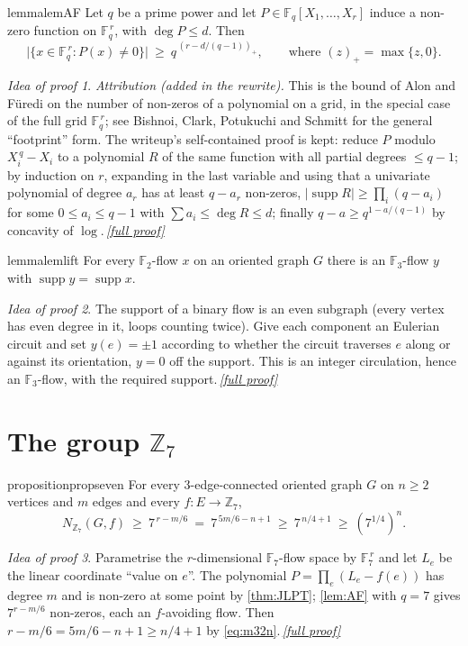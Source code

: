 \documentclass[11pt,a4paper]{article}
\theoremstyle{plain}
\theoremstyle{definition}
\theoremstyle{remark}
\newtheorem*{proofidea}{Idea of proof}
\newcommand{\fullproofref}[1]{\,\hyperref[#1]{\textit{[full proof]}}}
\newcommand{\F}{{\mathbb F}}
\newcommand{\Z}{{\mathbb Z}}
\newcommand{\Nf}{N}
\DeclareMathOperator{\supp}{supp}
\newcommand{\pos}[1]{(#1)_{+}}
\begin{document}
\begin{restatable}{lemma}{lemAF}\label{lem:AF}
Let $q$ be a prime power and let $P\in\F_q[X_1,\dots,X_r]$ induce a non-zero function on $\F_q^{\,r}$, with $\deg P\le d$. Then
\[
 \bigl|\{x\in\F_q^{\,r}: P(x)\ne0\}\bigr|\ \ge\ q^{\,\pos{r-d/(q-1)}},\qquad\text{where }\pos{z}=\max\{z,0\}.
\]
\end{restatable}
\begin{proofidea}
\emph{Attribution (added in the rewrite).} This is the bound of Alon and Füredi \cite[Theorem~5]{AF93} on the number of non-zeros of a polynomial on a grid, in the special case of the full grid $\F_q^{\,r}$; see Bishnoi, Clark, Potukuchi and Schmitt \cite{BCPS18} for the general ``footprint'' form. The writeup's self-contained proof is kept: reduce $P$ modulo $X_i^{\,q}-X_i$ to a polynomial $R$ of the same function with all partial degrees $\le q-1$; by induction on $r$, expanding in the last variable and using that a univariate polynomial of degree $a_r$ has at least $q-a_r$ non-zeros, $|\supp R|\ge\prod_i(q-a_i)$ for some $0\le a_i\le q-1$ with $\sum a_i\le\deg R\le d$; finally $q-a\ge q^{1-a/(q-1)}$ by concavity of $\log$.\fullproofref{pf:AF}
\end{proofidea}

\begin{restatable}{lemma}{lemlift}\label{lem:lift}
For every $\F_2$-flow $x$ on an oriented graph $G$ there is an $\F_3$-flow $y$ with $\supp y=\supp x$.
\end{restatable}
\begin{proofidea}
The support of a binary flow is an even subgraph (every vertex has even degree in it, loops counting twice). Give each component an Eulerian circuit and set $y(e)=\pm1$ according to whether the circuit traverses $e$ along or against its orientation, $y=0$ off the support. This is an integer circulation, hence an $\F_3$-flow, with the required support.\fullproofref{pf:lift}
\end{proofidea}

\section{The group \texorpdfstring{$\Z_7$}{Z7}}\label{sec:z7}

\begin{restatable}{proposition}{propseven}\label{prop:z7}
For every $3$-edge-connected oriented graph $G$ on $n\ge2$ vertices and $m$ edges and every $f\colon E\to\Z_7$,
\[
 \Nf_{\Z_7}(G,f)\ \ge\ 7^{\,r-m/6}\ =\ 7^{\,5m/6-n+1}\ \ge\ 7^{\,n/4+1}\ \ge\ (7^{1/4})^{n}.
\]
\end{restatable}
\begin{proofidea}
Parametrise the $r$-dimensional $\F_7$-flow space by $\F_7^{\,r}$ and let $L_e$ be the linear coordinate ``value on $e$''. The polynomial $P=\prod_e(L_e-f(e))$ has degree $m$ and is non-zero at some point by \cref{thm:JLPT}; \cref{lem:AF} with $q=7$ gives $7^{r-m/6}$ non-zeros, each an $f$-avoiding flow. Then $r-m/6=5m/6-n+1\ge n/4+1$ by \eqref{eq:m32n}.\fullproofref{pf:z7}
\end{proofidea}
\end{document}
